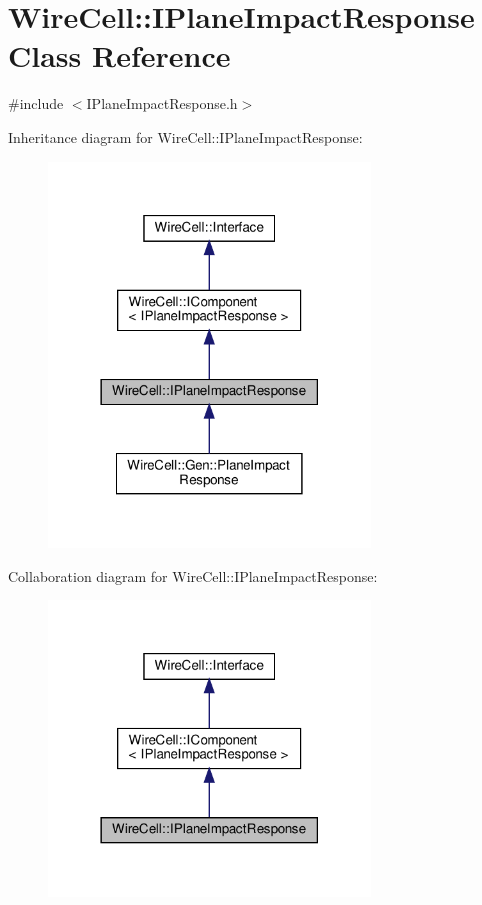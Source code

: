 \hypertarget{class_wire_cell_1_1_i_plane_impact_response}{}\section{Wire\+Cell\+:\+:I\+Plane\+Impact\+Response Class Reference}
\label{class_wire_cell_1_1_i_plane_impact_response}


{\ttfamily \#include $<$I\+Plane\+Impact\+Response.\+h$>$}



Inheritance diagram for Wire\+Cell\+:\+:I\+Plane\+Impact\+Response\+:
\nopagebreak
\begin{figure}[H]
\begin{center}
\leavevmode
\includegraphics[width=242pt]{class_wire_cell_1_1_i_plane_impact_response__inherit__graph}
\end{center}
\end{figure}


Collaboration diagram for Wire\+Cell\+:\+:I\+Plane\+Impact\+Response\+:
\nopagebreak
\begin{figure}[H]
\begin{center}
\leavevmode
\includegraphics[width=242pt]{class_wire_cell_1_1_i_plane_impact_response__coll__graph}
\end{center}
\end{figure}
